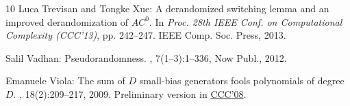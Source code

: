 \documentclass[11pt]{article}
\numberwithin{equation}{section}
\theoremstyle{definition}
\theoremstyle{plain}
\begin{document}
\begin{thebibliography}{10}
{\sc Luca Trevisan and Tongke Xue}: A derandomized switching lemma and an
  improved derandomization of ${AC}^0$.
\newblock In {\em Proc. 28th IEEE Conf. on Computational Complexity (CCC'13)},
  pp. 242--247. IEEE Comp. Soc. Press, 2013.

{\sc Salil Vadhan}: Pseudorandomness.
,
  7(1--3):1--336, Now Publ., 2012.
\newblock [\epfmtdoi{10.1561/0400000010}]

{\sc Emanuele Viola}: The sum of ${D}$ small-bias generators fools polynomials
  of degree ${D}$.
, 18(2):209--217, 2009.
\newblock Preliminary version in
  \href{https://doi.org/10.1109/CCC.2008.16}{CCC'08}.
\newblock [\epfmtdoi{10.1007/s00037-009-0273-5}]

\end{thebibliography}
\end{document}
